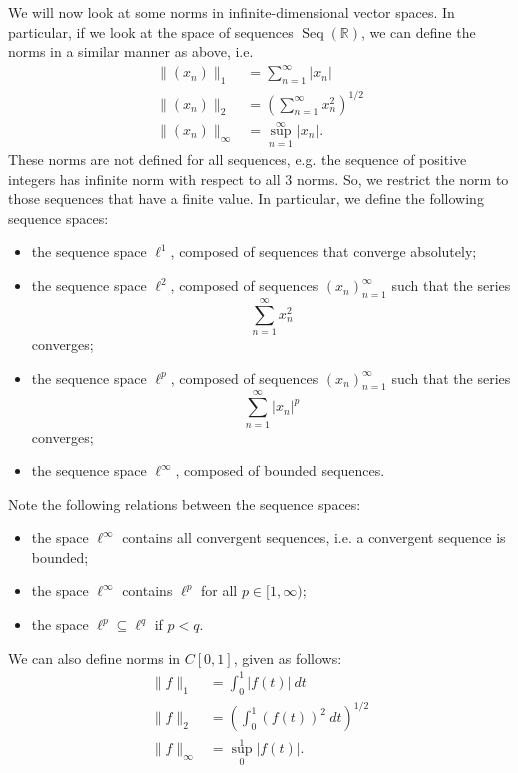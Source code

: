\documentclass[a4paper, openany]{memoir}
\theoremstyle{definition}
\theoremstyle{plain}
\begin{document}
    We will now look at some norms in infinite-dimensional vector spaces. In particular, if we look at the space of sequences $\operatorname{Seq}(\mathbb{R})$, we can define the norms in a similar manner as above, i.e.
    \begin{align*}
        \lVert (x_n) \rVert_1 &= \sum_{n=1}^\infty |x_n| \\
        \lVert (x_n) \rVert_2 &= \left(\sum_{n=1}^\infty x_n^2\right)^{1/2} \\
        \lVert (x_n) \rVert_\infty &= \sup_{n=1}^\infty |x_n|.
    \end{align*}
    These norms are not defined for all sequences, e.g. the sequence of positive integers has infinite norm with respect to all 3 norms. So, we restrict the norm to those sequences that have a finite value. In particular, we define the following sequence spaces:
    \begin{itemize}
        \item the sequence space $\ell^1$, composed of sequences that converge absolutely;
        \item the sequence space $\ell^2$, composed of sequences $(x_n)_{n=1}^\infty$ such that the series
        \[\sum_{n=1}^\infty x_n^2\]
        converges;
        \item the sequence space $\ell^p$, composed of sequences $(x_n)_{n=1}^\infty$ such that the series
        \[\sum_{n=1}^\infty |x_n|^p\]
        converges;
        \item the sequence space $\ell^\infty$, composed of bounded sequences.
    \end{itemize}
    Note the following relations between the sequence spaces:
    \begin{itemize}
        \item the space $\ell^\infty$ contains all convergent sequences, i.e. a convergent sequence is bounded;
        \item the space $\ell^\infty$ contains $\ell^p$ for all $p \in [1, \infty)$;
        \item the space $\ell^p \subseteq \ell^q$ if $p < q$.
    \end{itemize}

    We can also define norms in $C[0, 1]$, given as follows:
    \begin{align*}
        \lVert f \rVert_1 &= \int_0^1 |f(t)| \ dt \\
        \lVert f \rVert_2 &= \left(\int_0^1 (f(t))^2 \ dt\right)^{1/2} \\
        \lVert f \rVert_\infty &= \sup_0^1 |f(t)|.
    \end{align*}
    
\end{document}
